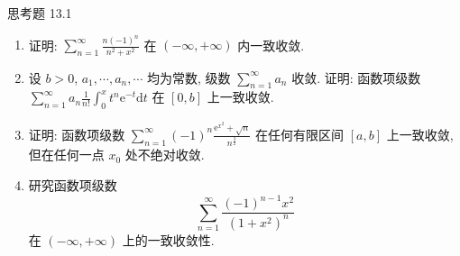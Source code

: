 \begin{exblock}{思考题 13.1}
\begin{enumerate}
\[\]
  当且仅当 $\alpha<1$ 时, 在 $[0,+\infty)$ 上一致收敛于 $0$.
  \item 证明: $\sum_{n=1}^{\infty}\frac{n(-1)^{n}}{n^{2}+x^{2}}$ 在 $(-\infty,+\infty)$ 内一致收敛.
  \item 设 $b>0$, $a_{1},\cdots,a_{n},\cdots$ 均为常数, 级数 $\sum_{n=1}^{\infty}a_{n}$ 收敛. 证明: 函数项级数 $\sum_{n=1}^{\infty}a_{n}\frac{1}{n!}\int_{0}^{x}t^{n}\mathrm{e}^{-t}\mathrm{d}t$ 在 $[0,b]$ 上一致收敛.
  \item 证明: 函数项级数 $\sum_{n=1}^{\infty}(-1)^{n}\frac{\mathrm{e}^{x^{2}}+\sqrt{n}}{n^{\frac{3}{2}}}$ 在任何有限区间 $[a,b]$ 上一致收敛, 但在任何一点 $x_{0}$ 处不绝对收敛.
  \item 研究函数项级数
  \[
    \sum_{n=1}^{\infty}\frac{(-1)^{n-1}x^{2}}{(1+x^{2})^{n}}
\]
  在 $(-\infty,+\infty)$ 上的一致收敛性.
\end{enumerate}
\end{exblock}
